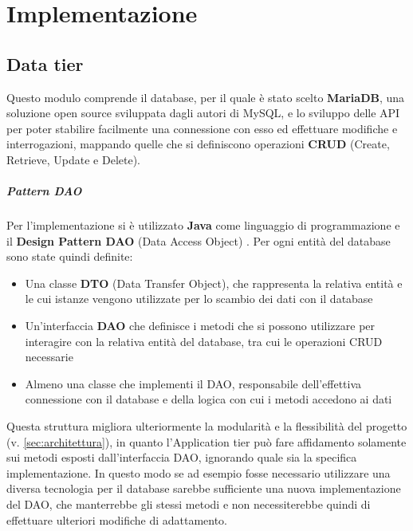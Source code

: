 
\chapter{Implementazione}


\section{Data tier}
Questo modulo comprende il database, per il quale è stato scelto \textbf{MariaDB},
una soluzione open source sviluppata dagli autori di MySQL, e lo sviluppo delle
API per poter stabilire facilmente una connessione con esso ed effettuare
modifiche e interrogazioni, mappando quelle che si definiscono operazioni
\textbf{CRUD} (Create, Retrieve, Update e Delete).

\paragraph{Pattern DAO}
Per l'implementazione si è utilizzato \textbf{Java} come linguaggio di programmazione
e il \textbf{Design Pattern DAO} (Data Access Object) \cite{J2EE-design-patterns}.
Per ogni entità del database sono state quindi definite:
\begin{itemize}
	\item Una classe \textbf{DTO} (Data Transfer Object), che rappresenta la
	relativa entità e le cui istanze vengono utilizzate per lo scambio dei dati
	con il database
	\item Un'interfaccia \textbf{DAO} che definisce i metodi che si possono
	utilizzare per interagire con la relativa entità del database, tra cui le
	operazioni CRUD necessarie
	\item Almeno una classe che implementi il DAO, responsabile dell'effettiva
	connessione con il database e della logica con cui i metodi accedono ai dati
\end{itemize}



Questa struttura migliora ulteriormente la modularità e la flessibilità del
progetto (v. \autoref{sec:architettura}), in quanto l'Application tier può
fare affidamento solamente sui metodi esposti dall'interfaccia DAO, ignorando quale
sia la specifica implementazione.
In questo modo se ad esempio fosse necessario utilizzare una diversa tecnologia
per il database sarebbe sufficiente una nuova implementazione del DAO, che
manterrebbe gli stessi metodi e non necessiterebbe quindi di effettuare ulteriori
modifiche di adattamento.

